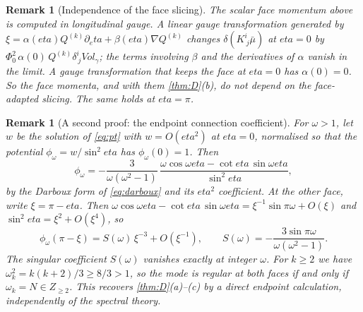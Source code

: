 \documentclass[11pt]{article}
\theoremstyle{canonmath}
\newtheorem{remark}[theorem]{Remark}
\theoremstyle{canonpostulate}
\theoremstyle{canonproposition}
\theoremstyle{canonmath}
\theoremstyle{canonproposition}
\providecommand{\Z}{\mathbb{Z}}
\def\mathrm#1{#1}%
\def\mathbb#1{#1}%
\def\eta{eta}%
\begin{document}
\begin{remark}[Independence of the face slicing]\label{rem:slicing}
The scalar face momentum above is computed in longitudinal gauge. A linear gauge transformation generated by $\xi = \alpha(\eta)Q^{(k)}\partial_\eta + \beta(\eta)\nabla Q^{(k)}$ changes $\delta(K^i_{\ j}\bar\mu)$ at $\eta = 0$ by $\Phi_0^2\,\alpha(0)\,Q^{(k)}\delta^i_{\ j}\mathrm{Vol}_\gamma$; the terms involving $\beta$ and the derivatives of $\alpha$ vanish in the limit. A gauge transformation that keeps the face at $\eta = 0$ has $\alpha(0) = 0$. So the face momenta, and with them \cref{thm:D}(b), do not depend on the face-adapted slicing. The same holds at $\eta = \pi$.
\end{remark}

\begin{remark}[A second proof: the endpoint connection coefficient]\label{rem:Somega}
For $\omega>1$, let $w$ be the solution of \eqref{eq:pt} with $w = O(\eta^2)$ at $\eta = 0$, normalised so that the potential $\phi_\omega = w/\sin^2\eta$ has $\phi_\omega(0) = 1$. Then
\[
\phi_\omega = -\frac{3}{\omega(\omega^2-1)}\,\frac{\omega\cos\omega\eta - \cot\eta\,\sin\omega\eta}{\sin^2\eta},
\]
by the Darboux form of \eqref{eq:darboux} and its $\eta^2$ coefficient. At the other face, write $\xi = \pi-\eta$. Then $\omega\cos\omega\eta - \cot\eta\,\sin\omega\eta = \xi^{-1}\sin\pi\omega + O(\xi)$ and $\sin^2\eta = \xi^2 + O(\xi^4)$, so
\begin{equation}
\phi_\omega(\pi-\xi) = S(\omega)\,\xi^{-3} + O(\xi^{-1}), \qquad S(\omega) = -\frac{3\sin\pi\omega}{\omega(\omega^2-1)} .
\label{eq:Somega}
\end{equation}
The singular coefficient $S(\omega)$ vanishes exactly at integer $\omega$. For $k\ge2$ we have $\omega_k^2 = k(k+2)/3\ge8/3>1$, so the mode is regular at both faces if and only if $\omega_k = N\in\Z_{\ge2}$. This recovers \cref{thm:D}(a)--(c) by a direct endpoint calculation, independently of the spectral theory.
\end{remark}
\end{document}
